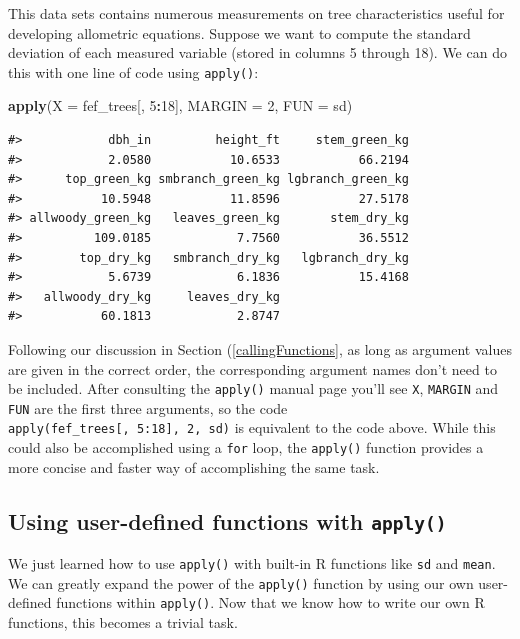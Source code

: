 \documentclass[
  11pt,
]{krantz}
\newenvironment{Shaded}{\begin{snugshade}}{\end{snugshade}}
\newcommand{\DataTypeTok}[1]{\textcolor[rgb]{0.13,0.29,0.53}{#1}}
\newcommand{\DecValTok}[1]{\textcolor[rgb]{0.00,0.00,0.81}{#1}}
\newcommand{\KeywordTok}[1]{\textcolor[rgb]{0.13,0.29,0.53}{\textbf{#1}}}
\newcommand{\NormalTok}[1]{#1}
\newcommand{\OperatorTok}[1]{\textcolor[rgb]{0.81,0.36,0.00}{\textbf{#1}}}
\theoremstyle{definition}
\theoremstyle{definition}
\theoremstyle{definition}
\theoremstyle{definition}
\theoremstyle{remark}
\begin{document}
This data sets contains numerous measurements on tree characteristics useful for developing allometric equations. Suppose we want to compute the standard deviation of each measured variable (stored in columns 5 through 18). We can do this with one line of code using \texttt{apply()}:

\begin{Shaded}
\begin{Highlighting}[]
\KeywordTok{apply}\NormalTok{(}\DataTypeTok{X =}\NormalTok{ fef\_trees[, }\DecValTok{5}\OperatorTok{:}\DecValTok{18}\NormalTok{], }\DataTypeTok{MARGIN =} \DecValTok{2}\NormalTok{, }\DataTypeTok{FUN =}\NormalTok{ sd)}
\end{Highlighting}
\end{Shaded}

\begin{verbatim}
#>            dbh_in         height_ft     stem_green_kg 
#>            2.0580           10.6533           66.2194 
#>      top_green_kg smbranch_green_kg lgbranch_green_kg 
#>           10.5948           11.8596           27.5178 
#> allwoody_green_kg   leaves_green_kg       stem_dry_kg 
#>          109.0185            7.7560           36.5512 
#>        top_dry_kg   smbranch_dry_kg   lgbranch_dry_kg 
#>            5.6739            6.1836           15.4168 
#>   allwoody_dry_kg     leaves_dry_kg 
#>           60.1813            2.8747
\end{verbatim}

Following our discussion in Section (\ref{callingFunctions}, as long as argument values are given in the correct order, the corresponding argument names don't need to be included. After consulting the \texttt{apply()} manual page you'll see \texttt{X}, \texttt{MARGIN} and \texttt{FUN} are the first three arguments, so the code \texttt{apply(fef\_trees{[},\ 5:18{]},\ 2,\ sd)} is equivalent to the code above. While this could also be accomplished using a \texttt{for} loop, the \texttt{apply()} function provides a more concise and faster way of accomplishing the same task.

\hypertarget{using-user-defined-functions-with-apply}{%
\subsection{\texorpdfstring{Using user-defined functions with \texttt{apply()}}{Using user-defined functions with apply()}}\label{using-user-defined-functions-with-apply}}

We just learned how to use \texttt{apply()} with built-in R functions like \texttt{sd} and \texttt{mean}. We can greatly expand the power of the \texttt{apply()} function by using our own user-defined functions within \texttt{apply()}. Now that we know how to write our own R functions, this becomes a trivial task.
\end{document}
